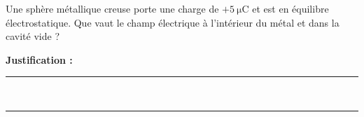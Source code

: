 Une sphère métallique creuse porte une charge de $+\qty{5}{\micro\coulomb}$ et est en équilibre électrostatique. Que vaut le champ électrique à l'intérieur du métal et dans la cavité vide ?

\choices

\noindent\textbf{Justification :} \hrulefill \\[2.5ex]
\rule{\linewidth}{0.4pt} \\[2.5ex]
\rule{\linewidth}{0.4pt}
\vfill
